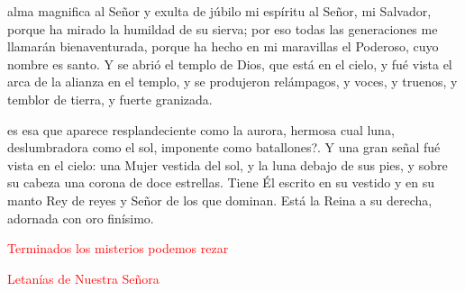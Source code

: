 \documentclass[10pt,twoside]{book}
\begin{document}
\noindent{}
\vspace{2mm}
alma magnifica al Señor y exulta de júbilo mi espíritu al Señor, mi Salvador, porque ha mirado la humildad de su sierva;
por eso todas las generaciones me llamarán bienaventurada, porque ha hecho en mi maravillas el Poderoso, cuyo nombre es santo. Y se abrió el templo de Dios, que está en el cielo,
y fué vista el arca de la alianza en el templo, y se produjeron relámpagos, y voces, y truenos, y temblor de tierra, y fuerte granizada.\\[2mm]

\vspace{5mm}

\noindent{}
\vspace{2mm}
es esa que aparece resplandeciente como la aurora, hermosa cual luna, deslumbradora como el sol, imponente como batallones?.
Y una gran señal fué vista en el cielo: una Mujer vestida del sol, y la luna debajo de sus  pies, y sobre su cabeza una corona de doce estrellas.
Tiene Él escrito en su vestido y en su manto Rey de reyes y Señor de los que dominan. Está la Reina a su derecha, adornada con oro finísimo.\\[2mm]

\vspace{5mm}

\label{final-prayer}
\begin{center}
      \textcolor{red}{Terminados los misterios podemos rezar}
\end{center}

\begin{paracol}{2}
      \vspace{6mm}
      \vspace{6mm}
      \vspace{6mm}
\end{paracol}
\vspace{3mm}
\begin{center}
      \textcolor{red}{Letanías de Nuestra Señora}
\end{center}
\end{document}
